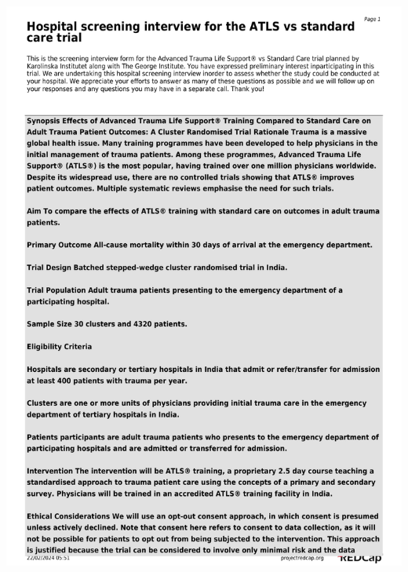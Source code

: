 \documentclass[
]{scrartcl}
\begin{document}
\includegraphics{./appendices/hospital-screening-interview-instrument/hospital-screening-interview-1.pdf}
\end{document}
